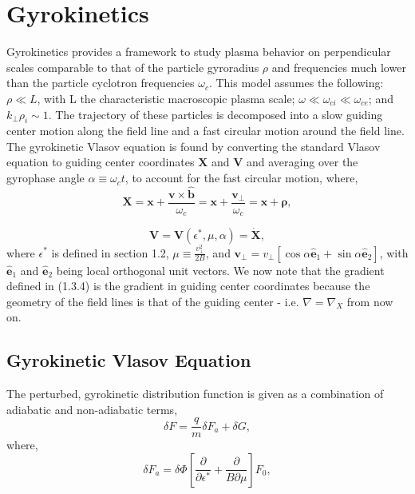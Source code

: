 \documentclass[12pt]{article}
\numberwithin{equation}{subsection}
\begin{document}
\section{Gyrokinetics}
   \quad Gyrokinetics provides a framework to study plasma behavior on perpendicular scales comparable to that of the
particle gyroradius $\rho$ and frequencies much lower than the particle cyclotron frequencies $\omega_c$. This model assumes
the following: $\rho \ll L$, with L the characteristic macroscopic plasma scale; $\omega \ll \omega_{ci} \ll \omega_{ce}$;
and $k_\perp \rho_i \sim 1$\cite{GyroKinAstr}. The trajectory of these particles is decomposed into a slow guiding center motion
along the field line and a fast circular motion around the field line. The gyrokinetic Vlasov equation is found by converting the
standard Vlasov equation to guiding center coordinates $\bm{X}$ and $\bm{V}$ and averaging over the gyrophase angle $\alpha
\equiv \omega_c t$, to account for the fast circular motion, where\cite{FriemanChen},
   \begin{equation}
      \bm{X} = \bm{x} + \frac{\bm{v}\times\bm{\hat{b}}}{\omega_c} = \bm{x} + \frac{\bm{v}_\perp}{\omega_c}
             = \bm{x} + \bm{\rho},
   \end{equation}

   \begin{equation}
      \bm{V} = \bm{V}(\epsilon^*, \mu, \alpha) = \dot{\bm{X}},
   \end{equation}
where $\epsilon^*$ is defined in section 1.2, $\mu \equiv \frac{v_\perp^2}{2B}$, and $\bm{v}_\perp =
v_\perp[\cos\alpha\bm{\hat{e}}_1 + \sin\alpha\bm{\hat{e}}_2]$\cite{FriemanChen}, with $\bm{\hat{e}}_1$
and $\bm{\hat{e}}_2$ being local orthogonal unit vectors. We now note that the gradient defined
in (1.3.4) is the gradient in guiding center coordinates because the geometry of the field lines
is that of the guiding center - i.e. $\nabla = \nabla_X$ from now on.

\subsection{Gyrokinetic Vlasov Equation}
   \quad The perturbed, gyrokinetic distribution function is given as a combination of adiabatic
and non-adiabatic terms\cite{FriemanChen},
   \begin{equation}
      \delta F = \frac{q}{m}\delta F_a + \delta G,
   \end{equation}
where,    
   \begin{equation}
      \delta F_a = \delta\Phi[\frac{\partial}{\partial\epsilon^*} + \frac{\partial}{B\partial\mu}]F_0, 
   \end{equation}
   
\end{document}
